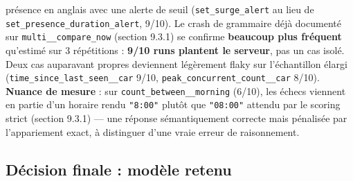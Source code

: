 \documentclass[11pt,a4paper]{article}
\let\Oldsubsection\subsection
\renewcommand{\subsection}{\FloatBarrier\Oldsubsection}
\begin{document}
\begin{itemize}[leftmargin=1.5em]
        présence en anglais avec une alerte de seuil
        (\texttt{set\_surge\_alert} au lieu de
        \texttt{set\_presence\_duration\_alert}, 9/10). Le crash de
        grammaire déjà documenté sur \texttt{multi\_\_compare\_now}
        (section 9.3.1) se confirme \textbf{beaucoup plus fréquent}
        qu'estimé sur 3 répétitions : \textbf{9/10 runs plantent le
        serveur}, pas un cas isolé. Deux cas auparavant propres deviennent
        légèrement flaky sur l'échantillon élargi
        (\texttt{time\_since\_last\_seen\_\_car} 9/10,
        \texttt{peak\_concurrent\_count\_\_car} 8/10). \textbf{Nuance de
        mesure} : sur \texttt{count\_between\_\_morning} (6/10), les échecs
        viennent en partie d'un horaire rendu \texttt{"8:00"} plutôt que
        \texttt{"08:00"} attendu par le scoring strict (section 9.3.1) ---
        une réponse sémantiquement correcte mais pénalisée par
        l'appariement exact, à distinguer d'une vraie erreur de
        raisonnement.
    \end{itemize}
    
    \subsection{Décision finale : modèle retenu}
    
\end{document}
